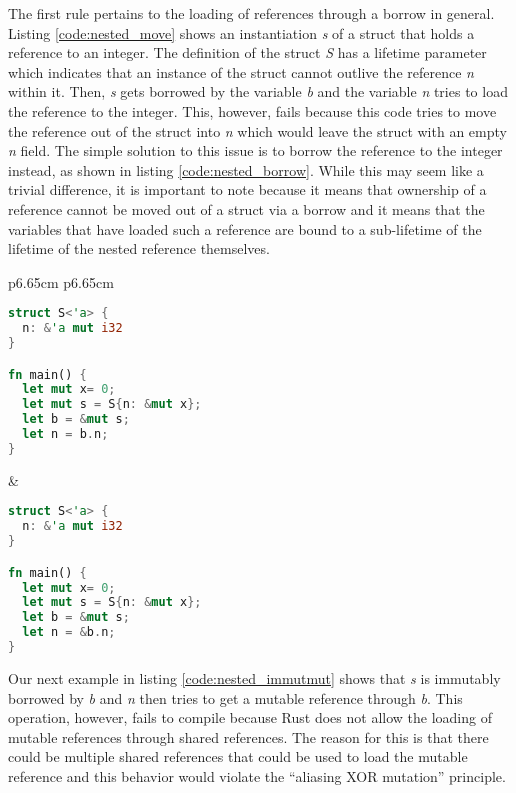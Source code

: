 The first rule pertains to the loading of references through a borrow in general.
Listing \ref{code:nested_move} shows an instantiation \textit{s} of a struct that holds a reference to an integer.
The definition of the struct \textit{S} has a lifetime parameter which indicates that an instance of the struct cannot outlive the reference \textit{n} within it.
Then, \textit{s} gets borrowed by the variable \textit{b} and the variable \textit{n} tries to load the reference to the integer.
This, however, fails because this code tries to move the reference out of the struct into \textit{n} which would leave the struct with an empty \textit{n} field.
The simple solution to this issue is to borrow the reference to the integer instead, as shown in listing \ref{code:nested_borrow}.
While this may seem like a trivial difference, it is important to note because it means that ownership of a reference cannot be moved out of a struct via a borrow and it means that the variables that have loaded such a reference are bound to a sub-lifetime of the lifetime of the nested reference themselves.
\begin{tabular}{p{6.65cm} p{6.65cm}}
    \begin{lstlisting}[language=Rust,frame=single,caption=Move reference,label=code:nested_move]
struct S<'a> {
  n: &'a mut i32
}

fn main() {
  let mut x= 0;
  let mut s = S{n: &mut x};
  let b = &mut s;
  let n = b.n;
}
    \end{lstlisting}

    &

    \begin{lstlisting}[language=Rust,frame=single,caption=Borrow reference,label=code:nested_borrow]
struct S<'a> {
  n: &'a mut i32
}

fn main() {
  let mut x= 0;
  let mut s = S{n: &mut x};
  let b = &mut s;
  let n = &b.n;
}
    \end{lstlisting}
\end{tabular}

Our next example in listing \ref{code:nested_immutmut} shows that \textit{s} is immutably borrowed by \textit{b} and \textit{n} then tries to get a mutable reference through \textit{b}.
This operation, however, fails to compile because Rust does not allow the loading of mutable references through shared references.
The reason for this is that there could be multiple shared references that could be used to load the mutable reference and this behavior would violate the ``aliasing XOR mutation'' principle.

